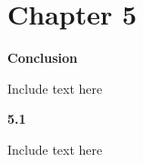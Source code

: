 \documentclass[12pt]{article}
\begin{document}
\section*{Chapter 5}
\begin{center}
\large \textbf{Conclusion}
\end{center}

Include text here

\vspace{1.5em}
\noindent
\textbf{5.1 }
\vspace{1.5em}

Include text here

\clearpage
\onehalfspacing

\renewcommand{\refname}{Bibliography}
\end{document}
